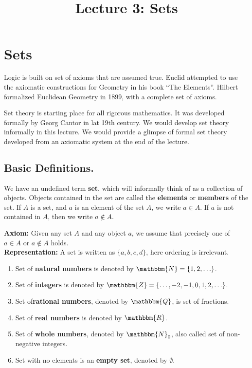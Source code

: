 \documentclass[a4paper,english,12pt]{article}
\title{ Lecture 3: Sets}
\author{}
\begin{document}
\maketitle

\section{Sets}
Logic is built on set of axioms that are assumed true. Euclid attempted to use the axiomatic constructions for Geometry in his book ``The Elements''. Hilbert formalized Euclidean Geometry in 1899, with a complete set of axioms. 

Set theory is starting place for all rigorous mathematics. It was developed formally by Georg Cantor in lat 19th century. We would develop set theory informally in this lecture. We would provide a glimpse of formal set theory developed from an axiomatic system at the end of the lecture. 
\subsection{Basic Definitions.}
We have an undefined term \textbf{set}, which will informally think of as a collection of objects. Objects contained in the set are called the \textbf{elements} or \textbf{members} of the set. If ${A}$ is a set, and $a$ is an element of the set ${A}$, we write $a\in {A}$. If $a$ is not contained in ${A}$, then we write $a\notin{A}$. 

\textbf{Axiom:} Given any set $A$ and any object $a$, we assume that precisely one of $a \in A$ or $a \notin A$ holds.\\
\textbf{Representation:} A set is written as $\{a,b,c,d\}$, here ordering is irrelevant. 

\begin{defn}
\begin{enumerate}
 \item Set of \textbf{natural numbers} is denoted by $\mathbbm{N} =\{1,2,\ldots\}$.
 \item Set of \textbf{integers} is denoted by $\mathbbm{Z} =\{\ldots,-2,-1,0, 1,2,\ldots\}$.
 \item Set of\textbf{rational numbers}, denoted by $\mathbbm{Q}$, is set of fractions.
 \item Set of \textbf{real numbers} is denoted by $\mathbbm{R}$.
 \item Set of \textbf{whole numbers}, denoted by $\mathbbm{N}_0$, also called set of non-negative integers.
 \item Set with no elements is an \textbf{empty set}, denoted by $\emptyset$.
\end{enumerate}
\end{defn}
\end{document}
